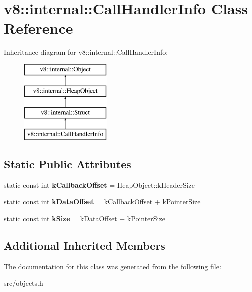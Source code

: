 \hypertarget{classv8_1_1internal_1_1_call_handler_info}{}\section{v8\+:\+:internal\+:\+:Call\+Handler\+Info Class Reference}
\label{classv8_1_1internal_1_1_call_handler_info}
Inheritance diagram for v8\+:\+:internal\+:\+:Call\+Handler\+Info\+:\begin{figure}[H]
\begin{center}
\leavevmode
\includegraphics[height=4.000000cm]{classv8_1_1internal_1_1_call_handler_info}
\end{center}
\end{figure}
\subsection*{Static Public Attributes}
\begin{DoxyCompactItemize}
\item 
\hypertarget{classv8_1_1internal_1_1_call_handler_info_ad9aed9fb5614164f1b8d192b302790b5}{}static const int {\bfseries k\+Callback\+Offset} = Heap\+Object\+::k\+Header\+Size\label{classv8_1_1internal_1_1_call_handler_info_ad9aed9fb5614164f1b8d192b302790b5}

\item 
\hypertarget{classv8_1_1internal_1_1_call_handler_info_aa561bcb66c855ae71541ccd05e8ba070}{}static const int {\bfseries k\+Data\+Offset} = k\+Callback\+Offset + k\+Pointer\+Size\label{classv8_1_1internal_1_1_call_handler_info_aa561bcb66c855ae71541ccd05e8ba070}

\item 
\hypertarget{classv8_1_1internal_1_1_call_handler_info_a0a3fbe1ab2ae6a37784983ece1b01d5d}{}static const int {\bfseries k\+Size} = k\+Data\+Offset + k\+Pointer\+Size\label{classv8_1_1internal_1_1_call_handler_info_a0a3fbe1ab2ae6a37784983ece1b01d5d}

\end{DoxyCompactItemize}
\subsection*{Additional Inherited Members}


The documentation for this class was generated from the following file\+:\begin{DoxyCompactItemize}
\item 
src/objects.\+h\end{DoxyCompactItemize}
